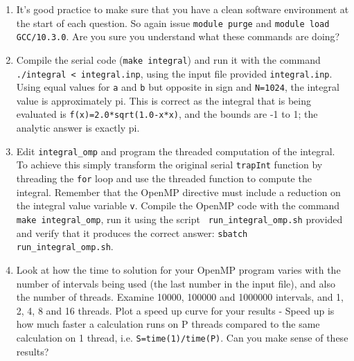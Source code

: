 \documentclass[a4paper, 12pt]{article}
\def \cc   {\tt }               %
\begin{document}
\begin{enumerate}

  \item It's good practice to make sure that you have a clean
    software environment at the start of each question. So
    again issue {\cc module purge} and
    {\cc module load GCC/10.3.0}. Are you sure you
    understand what these commands are doing?

  \item Compile the serial code ({\cc make integral}) and run it with
    the command {\cc ./integral < integral.inp}, using the input file
    provided {\cc integral.inp}.  Using equal values for {\cc a} and
    {\cc b} but opposite in sign and {\cc N=1024}, the integral value
    is approximately pi. This is correct as the integral that is being
    evaluated is {\cc f(x)=2.0*sqrt(1.0-x*x)}, and the bounds are -1 to 1;
    the analytic answer is exactly pi.

  \item Edit {\cc integral\_omp} and program the threaded computation
    of the integral.  To achieve this simply transform the original
    serial {\cc trapInt} function by threading the {\cc for} loop and
    use the threaded function to compute the integral.  Remember that
    the OpenMP directive must include a reduction on the integral
    value variable {\cc v}.  Compile the OpenMP code with the command
    {\cc make integral\_omp}, run it using the script {\cc
        run\_integral\_omp.sh} provided and verify that it produces the
    correct answer: {\cc sbatch run\_integral\_omp.sh}.

  \item Look at how the time to solution for your OpenMP program varies
    with the number of intervals being used (the last number in the input file),
    and also the number of threads. Examine 10000, 100000 and 1000000 intervals,
    and 1, 2, 4, 8 and 16 threads. Plot a speed up curve for your results -
    Speed up is how much faster a calculation runs on P threads compared to the same
    calculation on 1 thread, i.e. {\cc S=time(1)/time(P)}. Can you make sense of
    these results?

\end{enumerate}


\end{document}
